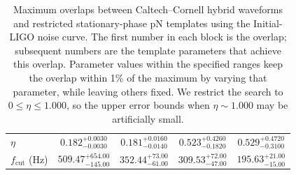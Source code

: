 \begin{table}
\begin{center}
\begin{tabular}{@{}lcccc@{}}
      $\eta$ &
      $0.182^{+0.0030}_{-0.0030}$  &
      $0.181^{+0.0160}_{-0.0140}$  &
      $0.523^{+0.4260}_{-0.1820}$  &
      $0.529^{+0.4720}_{-0.3100}$  \\
      $f_{\mathrm{cut}}$ (Hz) &
      $509.47^{+654.00}_{-145.00}$  &
      $352.44^{+73.00}_{-61.00}$  &
      $309.53^{+72.00}_{-47.00}$  &
      $195.63^{+21.00}_{-15.00}$  \\
      \hline \hline
    \end{tabular}
  \end{center}
  \caption[Overlaps between Caltech--Cornell hybrid waveforms and pN
waveforms in initial LIGO]{
  \label{tab:ThreeParamOverlapDetailInitial}
    Maximum overlaps between Caltech--Cornell hybrid waveforms
    and restricted stationary-phase pN templates using the
    Initial-LIGO noise curve.  The first number in each block is the
    overlap; subsequent numbers are the template parameters that
    achieve this overlap.  Parameter values within the specified
    ranges keep the overlap within 1\% of the maximum by varying that
    parameter, while leaving others fixed.  We restrict the search to
    $0 \leq \eta \leq 1.000$, so the upper error bounds when $\eta\sim
    1.000$ may be artificially small.}
\end{table}

%
%

